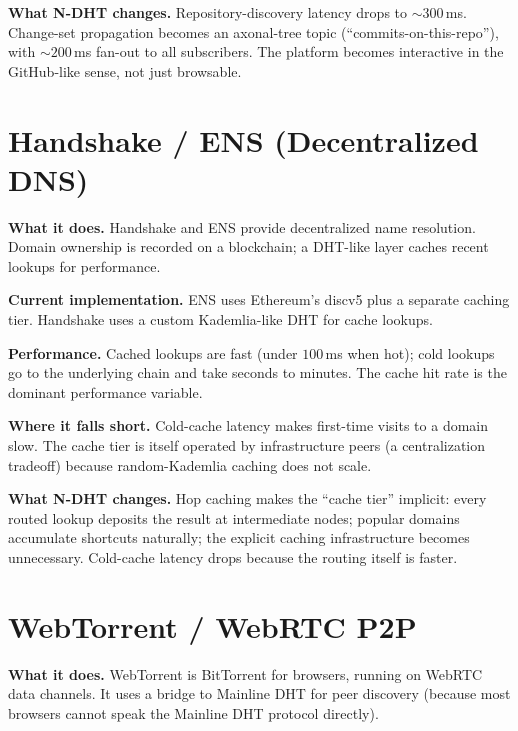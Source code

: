 \documentclass[twoside,nobib]{tufte-book}
\newcommand{\NDHT}{N-DHT\xspace}
\begin{document}
\textbf{What \NDHT changes.} Repository-discovery latency drops
to $\sim 300$\,ms. Change-set propagation becomes an axonal-tree
topic (``commits-on-this-repo''), with $\sim 200$\,ms fan-out
to all subscribers. The platform becomes interactive in the
GitHub-like sense, not just browsable.

\section{Handshake / ENS (Decentralized DNS)}

\textbf{What it does.} Handshake and ENS provide decentralized
name resolution. Domain ownership is recorded on a blockchain;
a DHT-like layer caches recent lookups for performance.

\textbf{Current implementation.} ENS uses Ethereum's discv5 plus
a separate caching tier. Handshake uses a custom Kademlia-like
DHT for cache lookups.

\textbf{Performance.} Cached lookups are fast (under
$100$\,ms when hot); cold lookups go to the underlying chain
and take seconds to minutes. The cache hit rate is the dominant
performance variable.

\textbf{Where it falls short.} Cold-cache latency makes
first-time visits to a domain slow. The cache tier is itself
operated by infrastructure peers (a centralization tradeoff)
because random-Kademlia caching does not scale.

\textbf{What \NDHT changes.} Hop caching makes the ``cache
tier'' implicit: every routed lookup deposits the result at
intermediate nodes; popular domains accumulate shortcuts
naturally; the explicit caching infrastructure becomes
unnecessary. Cold-cache latency drops because the routing
itself is faster.

\section{WebTorrent / WebRTC P2P}

\textbf{What it does.} WebTorrent is BitTorrent for browsers,
running on WebRTC data channels. It uses a bridge to Mainline
DHT for peer discovery (because most browsers cannot speak the
Mainline DHT protocol directly).
\end{document}
